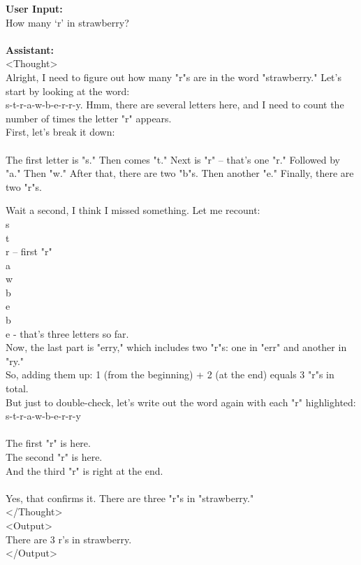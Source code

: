 \begin{abox} 
\textbf{User Input:}\\
How many `r' in strawberry?
\\
\\
\textbf{Assistant:}\\
<Thought>\\
Alright, I need to figure out how many "r"s are in the word "strawberry." Let's start by looking at the word: \\
s-t-r-a-w-b-e-r-r-y. Hmm, there are several letters here, and I need to count the number of times the letter "r" appears.\\
First, let's break it down:\\
\\
The first letter is "s."
Then comes "t."
Next is "r" – that's one "r."
Followed by "a."
Then "w."
After that, there are two "b"s.
Then another "e."
Finally, there are two "r"s.
\\
\end{abox}
\begin{abox}
Wait a second, I think I missed something. Let me recount:\\
s\\
t\\
r – first "r"\\
a\\
w\\
b\\
e\\
b\\
e - that's three letters so far.\\

Now, the last part is "erry," which includes two "r"s: one in "err" and another in "ry."\\
So, adding them up: 1 (from the beginning) + 2 (at the end) equals 3 "r"s in total.\\
But just to double-check, let's write out the word again with each "r" highlighted:\\
s-t-r-a-w-b-e-r-r-y\\
\\
The first "r" is here.\\
The second "r" is here.\\
And the third "r" is right at the end.\\
\\
Yes, that confirms it. There are three "r"s in "strawberry."\\
</Thought>\\
<Output>\\
There are 3 r's in strawberry.\\
</Output>
\end{abox}


